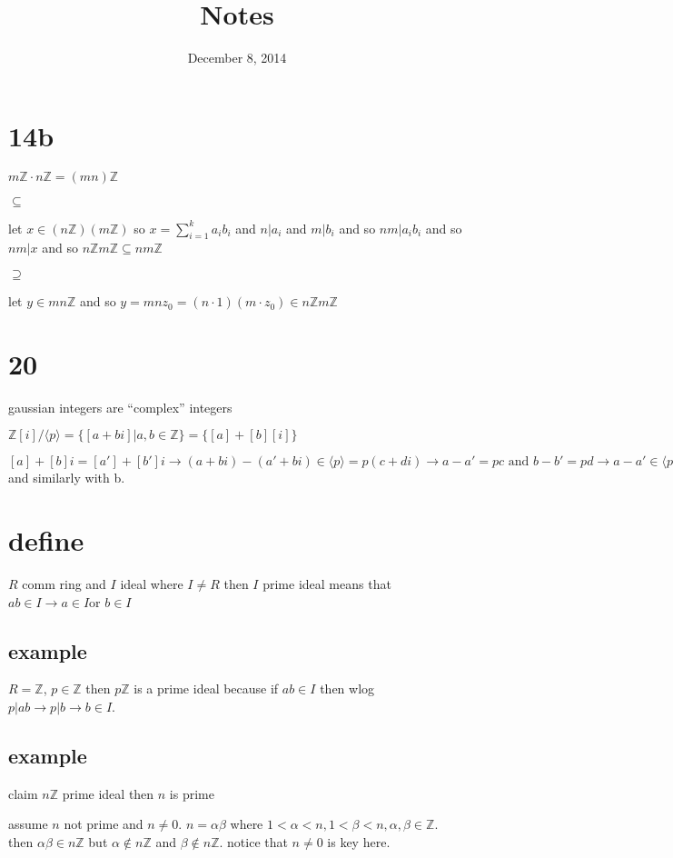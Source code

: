 \documentclass[letterpaper]{article}
\begin{document}
\title{Notes}
\date{December 8, 2014}
\maketitle
\section*{14b}
$m\mathbb{Z}\cdot n\mathbb{Z}=(mn)\mathbb{Z}$

$\subseteq$

let $x\in (n\mathbb{Z})(m\mathbb{Z})$ so $x=\sum\limits_{i=1}^k{a_ib_i}$ and $n|a_i$ and $m|b_i$ and so $nm|a_ib_i$ and so $nm|x$ and so $n\mathbb{Z}m\mathbb{Z}\subseteq nm\mathbb{Z}$

$\supseteq$

let $y\in mn\mathbb{Z}$ and so $y=mnz_0=(n\cdot 1)(m\cdot  z_0)\in n\mathbb{Z}m\mathbb{Z}$

\section*{20}
gaussian integers are ``complex'' integers

$\mathbb{Z}[i]/\langle p\rangle=\{[a+bi]|a,b\in\mathbb{Z}\}=\{[a]+[b][i]\}$

$[a]+[b]i=[a']+[b']i\to(a+bi)-(a'+bi)\in\langle p\rangle=p(c+di)\to a-a'=pc\text{ and }b-b'=pd\to a-a'\in \langle p\rangle\to [a]=[a']$ and similarly with b.

\section*{define}
$R$ comm ring and $I$ ideal where $I\ne R$ then $I$ prime ideal means that $ab\in I\to a\in I$or $b\in I$

\subsection*{example}
$R=\mathbb{Z}$, $p\in \mathbb{Z}$ then $p\mathbb{Z}$ is a prime ideal because if $ab\in I$ then wlog $p|ab\to p|b\to b\in I$.

\subsection*{example}
claim
$n\mathbb{Z}$ prime ideal then $n$ is prime

assume $n$ not prime and $n\ne 0$. $n=\alpha\beta$ where $1<\alpha<n, 1<\beta<n, \alpha,\beta\in \mathbb{Z}$. then $\alpha\beta\in n\mathbb{Z}$ but $\alpha\not\in n\mathbb{Z}$ and $\beta\not\in n\mathbb{Z}$. notice that $n\ne 0$ is key here.
\end{document}
